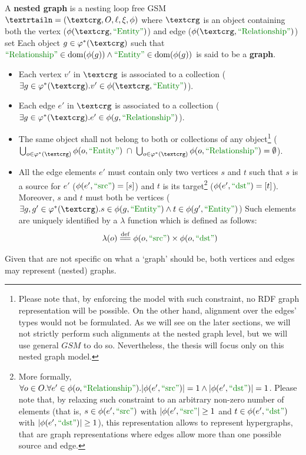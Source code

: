 \begin{definition}
	A \textbf{nested graph} is a nesting loop free GSM $\fullnested$  where $\ngraph$ is an object containing both the vertex ($\phi(\ngraph,\ONTA)$) and edge ($\phi(\ngraph,\RELA)$) set Each object $g\in \varphi^*(\ngraph)$ such that $\RELA\in\dom(\phi(g))\wedge \ONTA\in\dom(\phi(g))$ is said to be a \textbf{graph}.
	\begin{itemize}
		\item Each vertex $v'$ in $\ngraph$ is associated to a \ONTA collection ($\exists g\in\varphi^*(\ngraph). v'\in\phi(\ngraph,\ONTA)$).
		\item Each edge $e'$ in $\ngraph$ is associated to a \RELA collection ($\exists g\in\varphi^*(\ngraph).e'\in\phi(g,\RELA)$).
		\item  The same object shall not belong to both \ONTA or \RELA collections of any object\footnote{Please note that, by enforcing the model with such constraint, no RDF graph representation will be possible. On the other hand, alignment over the edges' types would not be formulated. As we will see on the later sections, we will not strictly perform such alignments at the nested graph level, but we will use general $GSM$ to do so. Nevertheless, the thesis will focus only on this nested graph model.} ($\bigcup_{o\in \varphi^*(\ngraph)}\phi(o,\ONTA)\;\cap\; \bigcup_{o\in \varphi^*(\ngraph)}\phi(o,\RELA)=\emptyset$).
		\item All the edge elements $e'$ must contain only two vertices $s$ and $t$ such that $s$ is a source for $e'$ ($\phi(e',\SRC)=[s]$) and $t$ is its target\footnote{More formally, $\forall o\in O.\forall e'\in\phi(o,\RELA).|\phi(e',\SRC)|=1\wedge |\phi(e',\DST)|=1$. Please note that, by relaxing such constraint to an arbitrary non-zero number of elements (that is, $s\in\phi(e',\SRC)$ with $|\phi(e',\SRC|\geq 1$ and $t\in\phi(e',\DST)$ with $|\phi(e',\DST)|\geq 1$), this representation allows to represent hypergraphs, that are graph representations where edges allow more than one possible source and edge.} ($\phi(e',\DST)=[t]$). Moreover, $s$ and $t$ must both be vertices ($\exists g,g'\in\varphi^*(\ngraph). s\in\phi(g,\ONTA)\wedge t\in\phi(g',\ONTA)$) Such elements are uniquely identified by a $\lambda$ function which is defined as follows:
		\[\lambda(o)\eqdef \phi(o,\SRC)\times\phi(o,\DST)\]
\end{itemize}
Given that are not specific on what a `graph' should be, both vertices and edges may represent (nested) graphs.
\end{definition}


